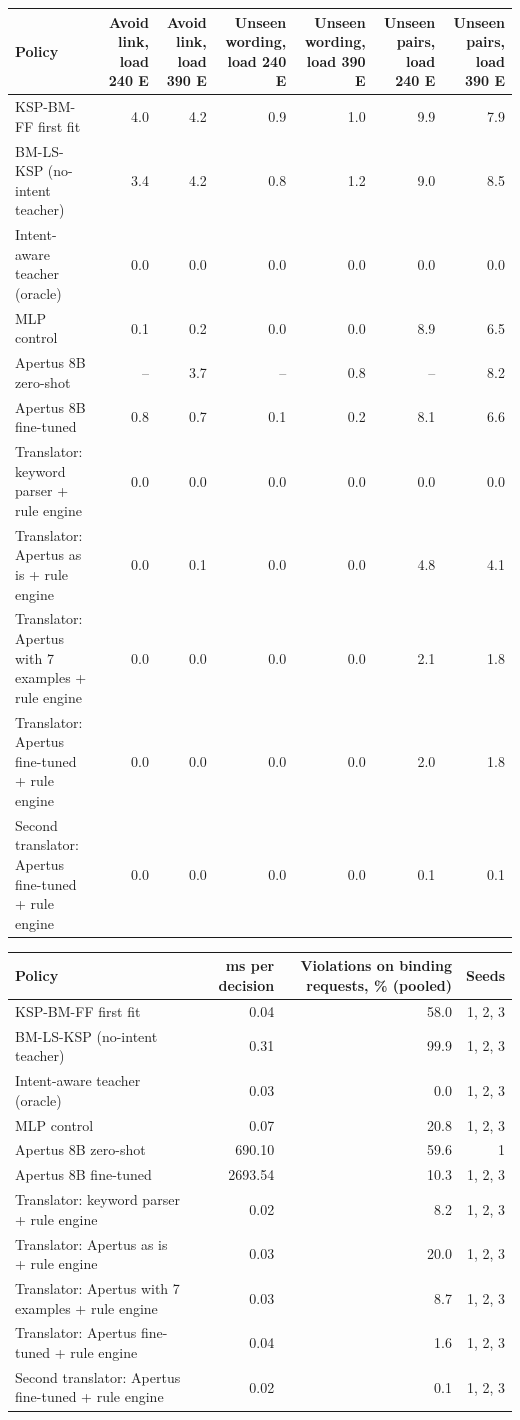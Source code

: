 \begin{tabular}{lrrrrrr}
\toprule
Policy & Avoid link, load 240 E & Avoid link, load 390 E & Unseen wording, load 240 E & Unseen wording, load 390 E & Unseen pairs, load 240 E & Unseen pairs, load 390 E \\
\midrule
KSP-BM-FF first fit & 4.0 & 4.2 & 0.9 & 1.0 & 9.9 & 7.9 \\
BM-LS-KSP (no-intent teacher) & 3.4 & 4.2 & 0.8 & 1.2 & 9.0 & 8.5 \\
Intent-aware teacher (oracle) & 0.0 & 0.0 & 0.0 & 0.0 & 0.0 & 0.0 \\
MLP control & 0.1 & 0.2 & 0.0 & 0.0 & 8.9 & 6.5 \\
Apertus 8B zero-shot & -- & 3.7 & -- & 0.8 & -- & 8.2 \\
Apertus 8B fine-tuned & 0.8 & 0.7 & 0.1 & 0.2 & 8.1 & 6.6 \\
Translator: keyword parser + rule engine & 0.0 & 0.0 & 0.0 & 0.0 & 0.0 & 0.0 \\
Translator: Apertus as is + rule engine & 0.0 & 0.1 & 0.0 & 0.0 & 4.8 & 4.1 \\
Translator: Apertus with 7 examples + rule engine & 0.0 & 0.0 & 0.0 & 0.0 & 2.1 & 1.8 \\
Translator: Apertus fine-tuned + rule engine & 0.0 & 0.0 & 0.0 & 0.0 & 2.0 & 1.8 \\
Second translator: Apertus fine-tuned + rule engine & 0.0 & 0.0 & 0.0 & 0.0 & 0.1 & 0.1 \\
\bottomrule
\end{tabular}

\begin{tabular}{lrrr}
\toprule
Policy & ms per decision & Violations on binding requests, \% (pooled) & Seeds \\
\midrule
KSP-BM-FF first fit & 0.04 & 58.0 & 1, 2, 3 \\
BM-LS-KSP (no-intent teacher) & 0.31 & 99.9 & 1, 2, 3 \\
Intent-aware teacher (oracle) & 0.03 & 0.0 & 1, 2, 3 \\
MLP control & 0.07 & 20.8 & 1, 2, 3 \\
Apertus 8B zero-shot & 690.10 & 59.6 & 1 \\
Apertus 8B fine-tuned & 2693.54 & 10.3 & 1, 2, 3 \\
Translator: keyword parser + rule engine & 0.02 & 8.2 & 1, 2, 3 \\
Translator: Apertus as is + rule engine & 0.03 & 20.0 & 1, 2, 3 \\
Translator: Apertus with 7 examples + rule engine & 0.03 & 8.7 & 1, 2, 3 \\
Translator: Apertus fine-tuned + rule engine & 0.04 & 1.6 & 1, 2, 3 \\
Second translator: Apertus fine-tuned + rule engine & 0.02 & 0.1 & 1, 2, 3 \\
\bottomrule
\end{tabular}
